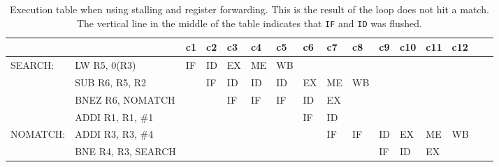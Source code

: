 \begin{landscape}
    \begin{table}[]
    \centering
    \begin{tabular}{llllllllllllllll}
    \hline
             &                                         & c1 & c2 & c3 & c4 & c5 & c6 & c7                      & c8 & c9 & c10 & c11 & c12 \\ \hline
    SEARCH:  & \multicolumn{1}{l|}{LW R5, 0(R3)}       & IF & ID & EX & ME & WB &    &                         &    &    &     &     &     \\
             & \multicolumn{1}{l|}{SUB R6, R5, R2}     &    & IF & ID & ID & ID & EX & ME                      & WB &    &     &     &     \\
             & \multicolumn{1}{l|}{BNEZ R6, NOMATCH}   &    &    & IF & IF & IF & ID & EX                      &    &    &     &     &     \\
             & \multicolumn{1}{l|}{ADDI R1, R1, \#1}   &    &    &    &    &    & IF & \multicolumn{1}{l|}{ID} &    &    &     &     &     \\
    NOMATCH: & \multicolumn{1}{l|}{ADDI R3, R3, \#4}   &    &    &    &    &    &    & \multicolumn{1}{l|}{IF} & IF & ID & EX  & ME  & WB  \\
             & \multicolumn{1}{l|}{BNE R4, R3, SEARCH} &    &    &    &    &    &    &                         &    & IF & ID  & EX  &     \\ \hline
    \end{tabular}
    \caption{Execution table when using stalling and register forwarding. This is the result of the loop does not hit a match. The vertical line in the middle of the table indicates that \texttt{IF} and \texttt{ID} was flushed.}
    \label{tab:t21cmiss}
    \end{table}

\end{landscape}

